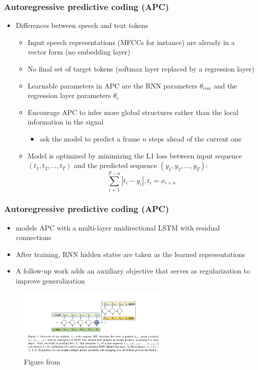 \documentclass[table]{beamer}
\begin{document}

\begin{frame}
\frametitle{Autoregressive predictive coding (APC)}
\begin{itemize}
\item Differences between speech and text tokens
		\begin{itemize}
			\item Input speech representations (MFCCs for instance) are already in a vector form (no embedding layer)
			\item No final set of target tokens (softmax layer replaced by a regression layer)
			\item Learnable parameters in APC are the RNN parameters $\theta_{rnn}$ and the regression layer parameters $\theta_r$
			\item Encourage APC to infer more global structures rather than the local information in the signal
				\begin{itemize}
				\item ask the model to predict a frame $n$ steps ahead of the current one
				\end{itemize}
			\item Model is optimized by minimizing the L1 loss between input sequence $(t_1,t_2,...,t_T )$ and the predicted sequence $(y_1,y_2,...,y_T )$:
				\begin{equation}
				\sum_{i=1}^{T-n} | t_i-y_i |,t_i=x_{i+n}
				\end{equation}			
		\end{itemize} 
\end{itemize} 
\end{frame}




\begin{frame}
\frametitle{Autoregressive predictive coding (APC)}
\begin{itemize}
\item  \cite{DBLP:journals/corr/abs-1904-03240} models APC with a multi-layer unidirectional LSTM with residual connections
\item After training, RNN hidden states are taken as the learned representations
\item A follow-up work \citep{chung2020improved} adds an auxiliary objective that serves as regularization to  improve generalization 
\end{itemize} 
\begin{figure}
	\includegraphics[width=0.65\textwidth]{regularization}
	\caption{Figure from  \citep{chung2020improved}}
\end{figure}

\end{frame}
\end{document}
